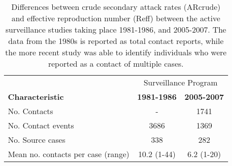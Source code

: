 \begin{table} %
\centering %
\caption{Differences between crude secondary attack rates (ARcrude) and effective reproduction number (Reff) between the active surveillance studies taking place 1981-1986, and 2005-2007. The data from the 1980s is reported as total contact reports, while the more recent study was able to identify individuals who were reported as a contact of multiple cases.} %
\begin{tabular}{lcc} %
\toprule %
& \multicolumn{2}{c}{Surveillance Program} \\ %
\cmidrule(l){2-3} %
\textbf{Characteristic} & \textbf{1981-1986} & \textbf{2005-2007} \\ %
\midrule %
No. Contacts & - & 1741 \\ %
No. Contact events & 3686 & 1369 \\ %
No. Source cases & 338 & 282 \\ %
Mean no. contacts per case (range) & 10.2 (1-44) & 6.2 (1-20) \\ %
\bottomrule %
\end{tabular}
\end{table}